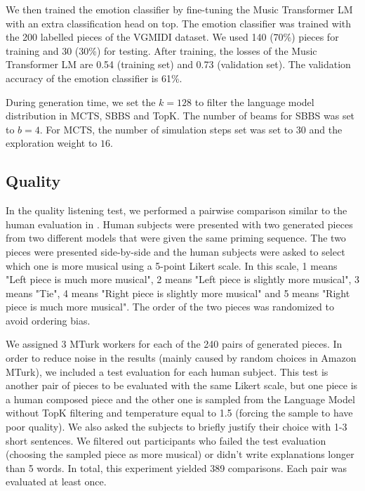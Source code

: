 We then trained the emotion classifier by fine-tuning the Music Transformer LM with an extra classification head on top. The emotion classifier was trained with the 200 labelled pieces of the VGMIDI dataset. We used 140 (70\%) pieces for training and 30 (30\%) for testing. After training, the losses of the Music Transformer LM are 0.54 (training set) and 0.73 (validation set). The validation accuracy of the emotion classifier is 61\%.

During generation time, we set the $k = 128$ to filter the language model distribution in MCTS,
SBBS and TopK. The number of beams for SBBS was set to $b = 4$. For MCTS, the number of simulation steps set was set to $30$ and the exploration weight to $16$.


\subsection{Quality}

In the quality listening test, we performed a pairwise comparison similar to the human evaluation in \cite {huang2018music}. Human subjects were presented with two generated pieces from two different models that were given the same priming sequence. The two pieces were
presented side-by-side and the human subjects were asked to select which one is more musical using a 5-point Likert scale. In this scale, 1 means "Left piece is much more musical", 2
means "Left piece is slightly more musical", 3 means "Tie", 4 means "Right piece is slightly more musical" and 5 means "Right piece is much more musical". The order of the two pieces was randomized to avoid ordering bias.

We assigned 3 MTurk workers for each of the 240 pairs of generated pieces. In order to reduce noise in the results (mainly caused by random choices in Amazon MTurk), we included a test evaluation for each human subject. This test is another pair of pieces to be evaluated with the same Likert scale, but one piece is a human composed piece and the other one is sampled from the Language Model without TopK filtering and temperature equal to 1.5 (forcing the sample to have poor quality). We also asked the subjects to briefly justify their choice with 1-3 short sentences. We filtered out participants who failed the test evaluation (choosing the sampled piece as more musical) or didn't write explanations longer than 5 words. In total, this experiment yielded 389 comparisons. Each pair was evaluated at least once.

